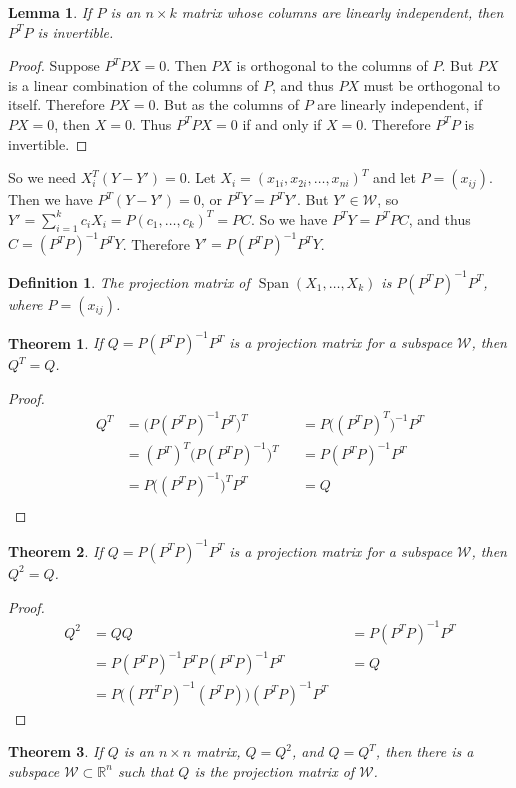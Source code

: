 \documentclass[oneside]{book}
\theoremstyle{mystyle}
\newtheorem{theorem}{Theorem}[section]
\newtheorem{definition}{Definition}[section]
\newtheorem{lemma}{Lemma}[section]
\DeclareMathOperator{\Span}{Span}
\begin{document}
\begin{lemma}
If $P$ is an $n\times k$ matrix whose columns are linearly independent, then $P^TP$ is invertible.
\end{lemma}
\begin{proof}
Suppose $P^TPX = 0$. Then $PX$ is orthogonal to the columns of $P$. But $PX$ is a linear combination of the columns of $P$, and thus $PX$ must be orthogonal to itself. Therefore $PX = 0$. But as the columns of $P$ are linearly independent, if $PX = 0$, then $X=0$. Thus $P^TPX = 0$ if and only if $X=0$. Therefore $P^TP$ is invertible.
\end{proof}
So we need $X_i^T(Y-Y') = 0$. Let $X_i = (x_{1i},x_{2i},\hdots, x_{ni})^{T}$ and let $P = (x_{ij})$. Then we have $P^T(Y-Y') = 0$, or $P^TY = P^T Y'$. But $Y'\in \mathcal{W}$, so $Y' = \sum_{i=1}^{k} c_i X_i = P(c_1,\hdots, c_k)^T = PC$. So we have $P^TY = P^TPC$, and thus $C = (P^TP)^{-1}P^TY$. Therefore $Y'=P(P^TP)^{-1}P^T Y$.
\begin{definition}
The projection matrix of $\Span(X_{1},\hdots,X_{k})$ is $P(P^TP)^{-1}P^T$, where $P=(x_{ij})$.
\end{definition}
\begin{theorem}
If $Q = P(P^TP)^{-1}P^T$ is a projection matrix for a subspace $\mathcal{W}$, then $Q^T =Q$.
\end{theorem}
\begin{proof}
    \begin{align*}
        Q^T &= \big(P(P^TP)^{-1}P^T\big)^T & &= P\big((P^TP)^T\big)^{-1}P^T\\
        &= (P^T)^T\big(P(P^TP)^{-1}\big)^T & &= P(P^TP)^{-1}P^T\\
        &= P\big((P^TP)^{-1}\big)^TP^T & &= Q\\
    \end{align*}
\end{proof}
\begin{theorem}
If $Q = P(P^TP)^{-1}P^T$ is a projection matrix for a subspace $\mathcal{W}$, then $Q^2 = Q$.
\end{theorem}
\begin{proof}
    \begin{align*}
        Q^2 &= QQ & &=P(P^TP)^{-1}P^T\\
        &= P(P^TP)^{-1}P^T P(P^TP)^{-1}P^T & &= Q\\
        &= P\big((PT^TP)^{-1}(P^TP)\big)(P^TP)^{-1}P^T
    \end{align*}
\end{proof}
\begin{theorem}
If $Q$ is an $n\times n$ matrix, $Q = Q^{2}$, and $Q=Q^{T}$, then there is a subspace $\mathcal{W}\subset \mathbb{R}^{n}$ such that $Q$ is the projection matrix of $\mathcal{W}$.
\end{theorem}
\end{document}

